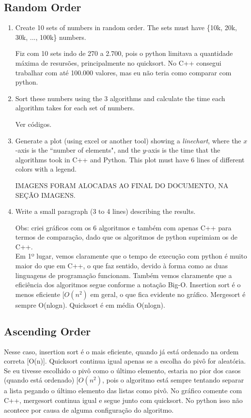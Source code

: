 \documentclass{article}
\begin{document}
\subsection{Random Order}
\begin{enumerate}
  \item Create 10 sets of numbers in random order. The sets must have \{10k, 20k, 30k, ..., 100k\} numbers.
  
  Fiz com 10 sets indo de 270 a 2.700, pois o python limitava a quantidade máxima de resursões, principalmente no quicksort. No C++ consegui trabalhar com até 100.000 valores, mas eu não teria como comparar com python.
  
  \item Sort these numbers using the 3 algorithms and calculate the time each algorithm takes for each set of numbers.
  
  Ver códigos.
  
  \item Generate a plot (using excel or another tool) showing a \emph{linechart}, where the $x$-axis is the ``number of elements", and the $y$-axis is the time that the algorithms took in C++ and Python. This plot must have 6 lines of different colors with a legend.
  
  IMAGENS FORAM ALOCADAS AO FINAL DO DOCUMENTO, NA SEÇÃO IMAGENS.
  
  \item Write a small paragraph (3 to 4 lines) describing the results.
  
  Obs: criei gráficos com os 6 algoritmos e também com apenas C++ para termos de comparação, dado que os algoritmos de python suprimiam os de C++.\\
  Em 1º lugar, vemos claramente que o tempo de execução com python é muito maior do que em C++, o que faz sentido, devido à forma como as duas linguagens de programação funcionam. Também vemos claramente que a eficiência dos algoritmos segue conforme a notação Big-O. 
  Insertion sort é o menos eficiente $[O(n^2)$ em geral, o que fica evidente no gráfico. Mergesort é sempre O(nlogn). Quicksort é em média O(nlogn).

\end{enumerate}

\subsection{Ascending Order}



Nesse caso, insertion sort é o mais eficiente, quando já está ordenado na ordem correta [O(n)]. Quicksort continua igual apenas se a escolha do pivô for aleatória. Se eu tivesse escolhido o pivô como o último elemento, estaria no pior dos casos (quando está ordenado) $[O(n^2)$, pois o algoritmo está sempre tentando separar a lista pegando o último elemento das listas como pivô. No gráfico comente com C++, mergesort continua igual e segue junto com quicksort. No python isso não acontece por causa de alguma configuração do algoritmo.
\end{document}

